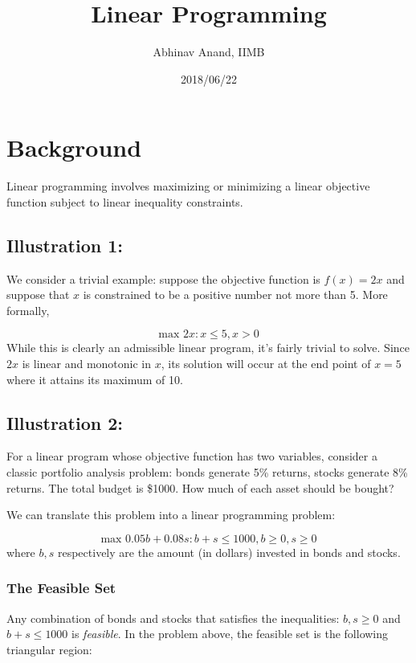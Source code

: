 \documentclass[11pt,]{article}
\title{Linear Programming}
\author{Abhinav Anand, IIMB}
\date{2018/06/22}
\begin{document}
\maketitle

\section{Background}\label{background}

Linear programming involves maximizing or minimizing a linear objective
function subject to linear inequality constraints.

\subsection{Illustration 1:}\label{illustration-1}

We consider a trivial example: suppose the objective function is
\(f(x) = 2x\) and suppose that \(x\) is constrained to be a positive
number not more than 5. More formally,

\[
\text{max } 2x: x\leq 5, x>0
\] While this is clearly an admissible linear program, it's fairly
trivial to solve. Since \(2x\) is linear and monotonic in \(x\), its
solution will occur at the end point of \(x=5\) where it attains its
maximum of 10.

\subsection{Illustration 2:}\label{illustration-2}

For a linear program whose objective function has two variables,
consider a classic portfolio analysis problem: bonds generate 5\%
returns, stocks generate 8\% returns. The total budget is \$1000. How
much of each asset should be bought?

We can translate this problem into a linear programming problem:

\[
\text{max } 0.05b+0.08s: b+s\leq 1000, b \geq 0, s \geq 0
\] where \(b, s\) respectively are the amount (in dollars) invested in
bonds and stocks.

\subsubsection{The Feasible Set}\label{the-feasible-set}

Any combination of bonds and stocks that satisfies the inequalities:
\(b ,s \geq 0\) and \(b+s\leq 1000\) is \emph{feasible}. In the problem
above, the feasible set is the following triangular region:
\end{document}
